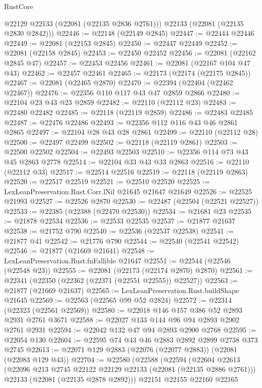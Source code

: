 \begin{lexlean}{RustCore}
\begin{coremodule}
        @22129
        @22133
        (@22081 (@22135 @2836 @2761)))
      @22133
      (@22081 (@22135 @2830 @2842)))
@22446 := @22148 (@22149 @2845)
@22447 := @22444 @22446
@22449 := @22081 (@22153 @2845)
@22450 := @22447 @22449
@22452 := @22081 (@22158 @2845)
@22453 := @22450 @22452
@22456 := @22081 (@22162 @2845 @47)
@22457 := @22453 @22456
@22461 := @22081 (@22167 @104 @47 @43)
@22462 := @22457 @22461
@22465 := @22173 (@22174 (@22175 @2845))
@22467 := @22081 (@22465 @2870)
@22470 := @22394 (@22404 (@22462 @22467))
@22476 := @22356 @110 @117 @43 @47 @2859 @2866
@22480 := @22104 @23 @43 @23 @2859
@22482 := @22110 (@22112 @23)
@22483 := @22480 @22482
@22485 := @22118 (@22119 @2859)
@22486 := @22483 @22485
@22487 := @22476 @22486
@22493 := @22356 @112 @116 @43 @46 @2861 @2865
@22497 := @22104 @28 @43 @28 @2861
@22499 := @22110 (@22112 @28)
@22500 := @22497 @22499
@22502 := @22118 (@22119 @2861)
@22503 := @22500 @22502
@22504 := @22493 @22503
@22510 := @22356 @114 @73 @43 @45 @2863 @2778
@22514 := @22104 @33 @43 @33 @2863
@22516 := @22110 (@22112 @33)
@22517 := @22514 @22516
@22519 := @22118 (@22119 @2863)
@22520 := @22517 @22519
@22521 := @22510 @22520
@22525 := LexLeanPreservation.Rust.Corr.lNil @21645 @21647 @21649
@22526 := @22525 @21993
@22527 := @22526 @2870
@22530 := @22487 (@22504 (@22521 @22527))
@22533 := @22385 (@22388 (@22470 @22530))
@22534 := @21681 @23
@22535 := @21878 @22534
@22536 := @22533 @22535
@22537 := @21877 @21637
@22538 := @21752 @790
@22540 := @22536 (@22537 @22538)
@22541 := @21877 @41
@22542 := @21776 @790
@22544 := @22540 (@22541 @22542)
@22546 := @21877 (@21669 @21641)
@22548 := LexLeanPreservation.Rust.fnFallible @21647
@22551 := @22544 (@22546 (@22548 @23))
@22555 := @22081 (@22173 (@22174 @2870) @2870)
@22561 := @22341 (@22350 (@22362 (@22371 (@22551 @22555)) @22527))
@22563 := @21877 (@21669 @21637)
@22565 := LexLeanPreservation.Rust.buildShape @21645
@22569 := @22563 (@22565 @99 @52 @2824)
@22572 := @22314 (@22323 (@22561 @22569))
@22580 := @22018 @146 @157 @386 @52 @2893 @2931 @2761 @3671
@22588 := @22027 @133 @144 @96 @94 @2893 @2902 @2761 @2931
@22594 := @22042 @132 @47 @94 @2893 @2900 @2768
@22595 := @22054 @130
@22604 := @22595 @74 @43 @46 @2883 @2892 @2899 @2738 @373 @2745
@22613 := @22071 @129 @2883 (@22076 (@22077 @2883)) (@22081 (@22083 @129 @43))
@22704 := @22580
    (@22588
      (@22594
        (@22604
          @22613
          (@22096 @213 @2745 @22122 @22129 @22133 (@22081 (@22135 @2886 @2761)))
          @22133
          (@22081 (@22135 @2878 @2892)))
        @22151
        @22155
        @22160
        @22165

\end{coremodule}
\end{lexlean}
